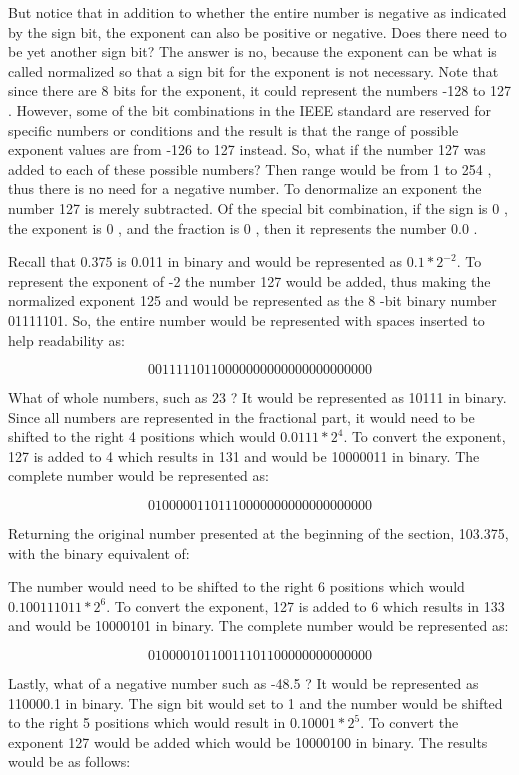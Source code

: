 \documentclass[10pt]{book}
\begin{document}
But notice that in addition to whether the entire number is negative as indicated by the sign bit, the exponent can also be positive or negative. Does there need to be yet another sign bit? The answer is no, because the exponent can be what is called normalized so that a sign bit for the exponent is not necessary. Note that since there are 8 bits for the exponent, it could represent the numbers -128 to 127 . However, some of the bit combinations in the IEEE standard are reserved for specific numbers or conditions and the result is that the range of possible exponent values are from -126 to 127 instead. So, what if the number 127 was added to each of these possible numbers? Then range would be from 1 to 254 , thus there is no need for a negative number. To denormalize an exponent the number 127 is merely subtracted. Of the special bit combination, if the sign is 0 , the exponent is 0 , and the fraction is 0 , then it represents the number 0.0 .

Recall that 0.375 is 0.011 in binary and would be represented as $0.1 * 2^{-2}$. To represent the exponent of -2 the number 127 would be added, thus making the normalized exponent 125 and would be represented as the 8 -bit binary number 01111101. So, the entire number would be represented with spaces inserted to help readability as:

$$
00111110110000000000000000000000
$$

What of whole numbers, such as 23 ? It would be represented as 10111 in binary. Since all numbers are represented in the fractional part, it would need to be shifted to the right 4 positions which would $0.0111 * 2^{4}$. To convert the exponent, 127 is added to 4 which results in 131 and would be 10000011 in binary. The complete number would be represented as:

$$
01000001101110000000000000000000
$$

Returning the original number presented at the beginning of the section, 103.375, with the binary equivalent of:

The number would need to be shifted to the right 6 positions which would $0.100111011 * 2^{6}$. To convert the exponent, 127 is added to 6 which results in 133 and would be 10000101 in binary. The complete number would be represented as:

$$
01000010110011101100000000000000
$$

Lastly, what of a negative number such as -48.5 ? It would be represented as 110000.1 in binary. The sign bit would set to 1 and the number would be shifted to the right 5 positions which would result in $0.10001 * 2^{5}$. To convert the exponent 127 would be added which would be 10000100 in binary. The results would be as follows:
\end{document}
